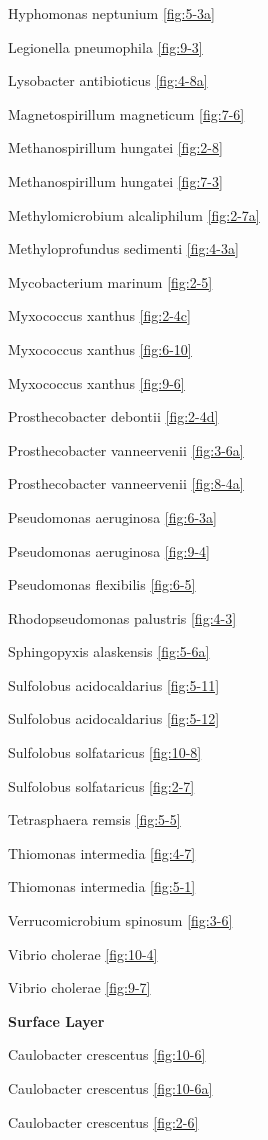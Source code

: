 \documentclass[]{tufte-book}
\begin{document}
Hyphomonas neptunium \ref{fig:5-3a}

Legionella pneumophila \ref{fig:9-3}

Lysobacter antibioticus \ref{fig:4-8a}

Magnetospirillum magneticum \ref{fig:7-6}

Methanospirillum hungatei \ref{fig:2-8}

Methanospirillum hungatei \ref{fig:7-3}

Methylomicrobium alcaliphilum \ref{fig:2-7a}

Methyloprofundus sedimenti \ref{fig:4-3a}

Mycobacterium marinum \ref{fig:2-5}

Myxococcus xanthus \ref{fig:2-4c}

Myxococcus xanthus \ref{fig:6-10}

Myxococcus xanthus \ref{fig:9-6}

Prosthecobacter debontii \ref{fig:2-4d}

Prosthecobacter vanneervenii \ref{fig:3-6a}

Prosthecobacter vanneervenii \ref{fig:8-4a}

Pseudomonas aeruginosa \ref{fig:6-3a}

Pseudomonas aeruginosa \ref{fig:9-4}

Pseudomonas flexibilis \ref{fig:6-5}

Rhodopseudomonas palustris \ref{fig:4-3}

Sphingopyxis alaskensis \ref{fig:5-6a}

Sulfolobus acidocaldarius \ref{fig:5-11}

Sulfolobus acidocaldarius \ref{fig:5-12}

Sulfolobus solfataricus \ref{fig:10-8}

Sulfolobus solfataricus \ref{fig:2-7}

Tetrasphaera remsis \ref{fig:5-5}

Thiomonas intermedia \ref{fig:4-7}

Thiomonas intermedia \ref{fig:5-1}

Verrucomicrobium spinosum \ref{fig:3-6}

Vibrio cholerae \ref{fig:10-4}

Vibrio cholerae \ref{fig:9-7}

\textbf{Surface Layer}

Caulobacter crescentus \ref{fig:10-6}

Caulobacter crescentus \ref{fig:10-6a}

Caulobacter crescentus \ref{fig:2-6}
\end{document}
